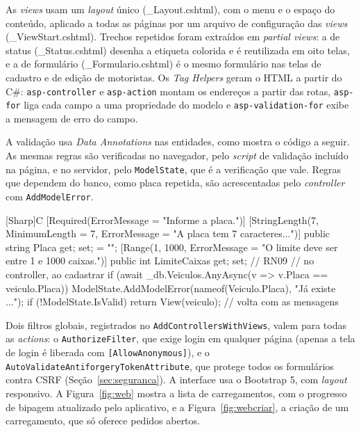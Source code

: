 As \textit{views} usam um \textit{layout} único (\_Layout.cshtml), com o menu e o espaço do conteúdo, aplicado a todas as páginas por um arquivo de configuração das \textit{views} (\_ViewStart.cshtml). Trechos repetidos foram extraídos em \textit{partial views}: a de status (\_Status.cshtml) desenha a etiqueta colorida e é reutilizada em oito telas, e a de formulário (\_Formulario.cshtml) é o mesmo formulário nas telas de cadastro e de edição de motoristas. Os \textit{Tag Helpers} geram o HTML a partir do C\#: \texttt{asp-controller} e \texttt{asp-action} montam os endereços a partir das rotas, \texttt{asp-for} liga cada campo a uma propriedade do modelo e \texttt{asp-validation-for} exibe a mensagem de erro do campo.

A validação usa \textit{Data Annotations} nas entidades, como mostra o código a seguir. As mesmas regras são verificadas no navegador, pelo \textit{script} de validação incluído na página, e no servidor, pelo \texttt{ModelState}, que é a verificação que vale. Regras que dependem do banco, como placa repetida, são acrescentadas pelo \textit{controller} com \texttt{AddModelError}.

\begin{codeblock}{[Sharp]C}
[Required(ErrorMessage = "Informe a placa.")]
[StringLength(7, MinimumLength = 7, ErrorMessage = "A placa tem 7 caracteres...")]
public string Placa { get; set; } = "";
[Range(1, 1000, ErrorMessage = "O limite deve ser entre 1 e 1000 caixas.")]
public int LimiteCaixas { get; set; }                          // RN09
// no controller, ao cadastrar
if (await _db.Veiculos.AnyAsync(v => v.Placa == veiculo.Placa))
    ModelState.AddModelError(nameof(Veiculo.Placa), "Já existe ...");
if (!ModelState.IsValid) return View(veiculo);    // volta com as mensagens
\end{codeblock}

Dois filtros globais, registrados no \texttt{AddControllers\allowbreak WithViews}, valem para todas as \textit{actions}: o \texttt{AuthorizeFilter}, que exige login em qualquer página (apenas a tela de login é liberada com \texttt{[AllowAnonymous]}), e o \texttt{AutoValidate\allowbreak Antiforgery\allowbreak TokenAttribute}, que protege todos os formulários contra CSRF (Seção~\ref{sec:seguranca}). A interface usa o Bootstrap 5, com \textit{layout} responsivo. A Figura~\ref{fig:web} mostra a lista de carregamentos, com o progresso de bipagem atualizado pelo aplicativo, e a Figura~\ref{fig:webcriar}, a criação de um carregamento, que só oferece pedidos abertos.

